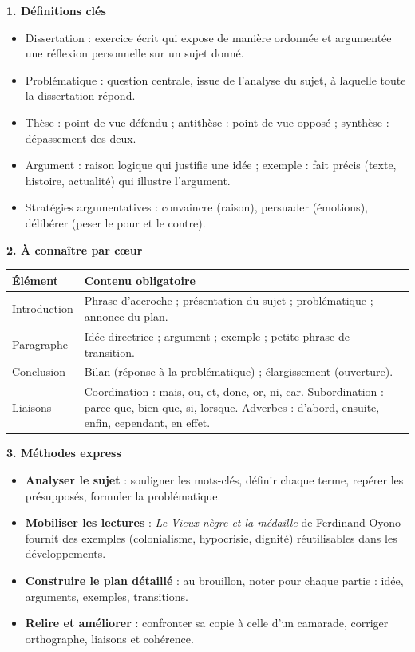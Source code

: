 \documentclass[11pt]{article}
\newcommand{\cle}[1]{{\popxbold\color{popdark}#1}}
\begin{document}
\begin{bilan}
\textbf{1. Définitions clés}
\begin{itemize}
  \item \cle{Dissertation} : exercice écrit qui expose de manière ordonnée et argumentée une réflexion personnelle sur un sujet donné.
  \item \cle{Problématique} : question centrale, issue de l'analyse du sujet, à laquelle toute la dissertation répond.
  \item \cle{Thèse} : point de vue défendu ; \cle{antithèse} : point de vue opposé ; \cle{synthèse} : dépassement des deux.
  \item \cle{Argument} : raison logique qui justifie une idée ; \cle{exemple} : fait précis (texte, histoire, actualité) qui illustre l'argument.
  \item \cle{Stratégies argumentatives} : convaincre (raison), persuader (émotions), délibérer (peser le pour et le contre).
\end{itemize}

\textbf{2. À connaître par c\oe ur}
\begin{center}
\begin{tabularx}{\linewidth}{|l|X|}
\hline
\rowcolor{popblueL} \textbf{Élément} & \textbf{Contenu obligatoire} \\
\hline
Introduction & Phrase d'accroche ; présentation du sujet ; problématique ; annonce du plan. \\
\hline
Paragraphe & Idée directrice ; argument ; exemple ; petite phrase de transition. \\
\hline
Conclusion & Bilan (réponse à la problématique) ; élargissement (ouverture). \\
\hline
Liaisons & Coordination : mais, ou, et, donc, or, ni, car. Subordination : parce que, bien que, si, lorsque. Adverbes : d'abord, ensuite, enfin, cependant, en effet. \\
\hline
\end{tabularx}
\end{center}

\textbf{3. Méthodes express}
\begin{itemize}
  \item \textbf{Analyser le sujet} : souligner les mots-clés, définir chaque terme, repérer les présupposés, formuler la problématique.
  \item \textbf{Mobiliser les lectures} : \emph{Le Vieux nègre et la médaille} de Ferdinand Oyono fournit des exemples (colonialisme, hypocrisie, dignité) réutilisables dans les développements.
  \item \textbf{Construire le plan détaillé} : au brouillon, noter pour chaque partie : idée, arguments, exemples, transitions.
  \item \textbf{Relire et améliorer} : confronter sa copie à celle d'un camarade, corriger orthographe, liaisons et cohérence.
\end{itemize}
\end{bilan}
\end{document}
